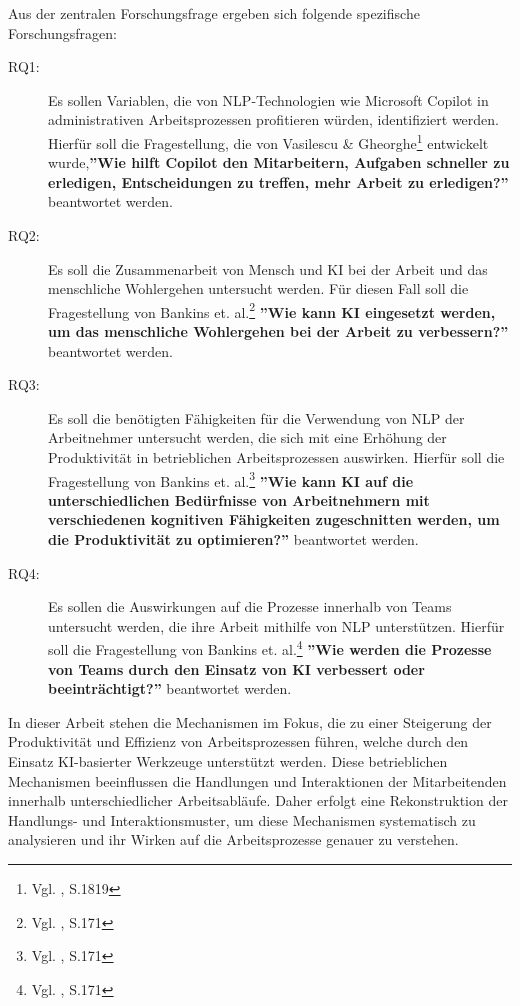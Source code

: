 Aus der zentralen Forschungsfrage ergeben sich folgende spezifische Forschungsfragen:
\begin{description}
    \item[RQ1:] Es sollen Variablen, die von NLP-Technologien wie Microsoft Copilot in administrativen Arbeitsprozessen profitieren würden, identifiziert werden. Hierfür soll die Fragestellung, die von Vasilescu \& Gheorghe\footnote{Vgl. \cite{Vasilescu2024}, S.1819} entwickelt wurde,\textbf{''Wie hilft Copilot den Mitarbeitern, Aufgaben schneller zu erledigen, Entscheidungen zu treffen, mehr Arbeit zu erledigen?''} beantwortet werden.
    \item[RQ2:] Es soll die Zusammenarbeit von Mensch und KI bei der Arbeit und das menschliche Wohlergehen untersucht werden. Für diesen Fall soll die Fragestellung von Bankins et. al.\footnote{Vgl. \cite{Bankins2024}, S.171} \textbf{''Wie kann KI eingesetzt werden, um das menschliche Wohlergehen bei der Arbeit zu verbessern?''} beantwortet werden.
    \item[RQ3:] Es soll die benötigten Fähigkeiten für die Verwendung von NLP der Arbeitnehmer untersucht werden, die sich mit eine Erhöhung der Produktivität in betrieblichen Arbeitsprozessen auswirken. Hierfür soll die Fragestellung von Bankins et. al.\footnote{Vgl. \cite{Bankins2024}, S.171} \textbf{''Wie kann KI auf die unterschiedlichen Bedürfnisse von Arbeitnehmern mit verschiedenen kognitiven Fähigkeiten zugeschnitten werden, um die Produktivität zu optimieren?''} beantwortet werden. 
    \item[RQ4:] Es sollen die Auswirkungen auf die Prozesse innerhalb von Teams untersucht werden, die ihre Arbeit mithilfe von NLP unterstützen. Hierfür soll die Fragestellung von Bankins et. al.\footnote{Vgl. \cite{Bankins2024}, S.171} \textbf{''Wie werden die Prozesse von Teams durch den Einsatz von KI verbessert oder beeinträchtigt?''} beantwortet werden. 
\end{description}

In dieser Arbeit stehen die Mechanismen im Fokus, die zu einer Steigerung der Produktivität und Effizienz von Arbeitsprozessen führen, welche durch den Einsatz KI-basierter Werkzeuge unterstützt werden. Diese betrieblichen Mechanismen beeinflussen die Handlungen und Interaktionen der Mitarbeitenden innerhalb unterschiedlicher Arbeitsabläufe. Daher erfolgt eine Rekonstruktion der Handlungs- und Interaktionsmuster, um diese Mechanismen systematisch zu analysieren und ihr Wirken auf die Arbeitsprozesse genauer zu verstehen.

\clearpage